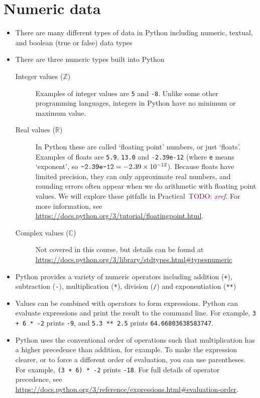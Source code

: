 \documentclass[a4paper,twoside,titlepage]{memoir}
\newcommand{\shellcmd}{\texttt}
\newcommand{\TODO}[1]{\textcolor{purple}{TODO: \emph{#1}}}
\begin{document}
\section{Numeric data}
\begin{itemize}
\item There are many different types of data in Python including numeric, textual, and boolean (true or false) data types
\item There are three numeric types built into Python
	\begin{description}
	\item[Integer values ($\mathbb{Z}$)]{Examples of integer values are \shellcmd{5} and \shellcmd{-8}.  Unlike some other programming languages, integers in Python have no minimum or maximum value.}
	\item[Real values ($\mathbb{R}$)]{In Python these are called `floating point' numbers, or just `floats'.  Examples of floats are \shellcmd{5.9}, \shellcmd{13.0} and \shellcmd{-2.39e-12} (where \shellcmd{e} means `exponent', so $\text{\shellcmd{-2.39e-12}} = \num{-2.39e-12}$).  Because floats have limited precision, they can only approximate real numbers, and rounding errors often appear when we do arithmetic with floating point values.  We will explore these pitfalls in Practical~\TODO{xref}.  For more information, see \url{https://docs.python.org/3/tutorial/floatingpoint.html}.}
	\item[Complex values ($\mathbb{C}$)]{Not covered in this course, but details can be found at \url{https://docs.python.org/3/library/stdtypes.html#typesnumeric}}
	\end{description}
\item Python provides a variety of numeric operators including addition (\shellcmd{+}), subtraction (\shellcmd{-}), multiplication (\shellcmd{*}), division (\shellcmd{/}) and exponentiation (\shellcmd{**})
\item Values can be combined with operators to form expressions.  Python can evaluate expressions and print the result to the command line.  For example, \shellcmd{3 + 6 * -2} prints \shellcmd{-9}, and \shellcmd{5.3 ** 2.5} prints \shellcmd{64.66803638583747}.
\item Python uses the conventional order of operations such that multiplication has a higher precedence than addition, for example.  To make the expression clearer, or to force a different order of evaluation, you can use parentheses.  For example, \shellcmd{(3 + 6) * -2} prints \shellcmd{-18}.  For full details of operator precedence, see \url{https://docs.python.org/3/reference/expressions.html#evaluation-order}.
\end{itemize}
\end{document}
